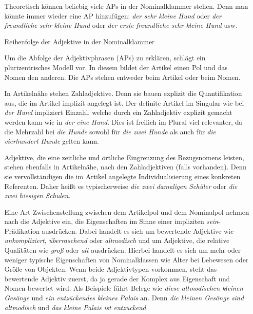 Theoretisch können beliebig viele APs in der Nominalklammer stehen. Denn man könnte immer wieder eine AP hinzufügen: \textit{der sehr kleine Hund} oder \textit{der freundliche sehr kleine Hund} oder \textit{der erste freundliche sehr kleine Hund} usw.  

\newpage
\begin{Exkurs}{Reihenfolge der Adjektive in der Nominalklammer}
    
\largerpage
Um die Abfolge der Adjektivphrasen (APs) zu erklären, schlägt \citet[317]{Eichinger1991} ein plurizentrisches Modell vor. In diesem bildet der Artikel einen Pol und das Nomen den anderen. Die APs stehen entweder beim Artikel oder beim Nomen. 

In Artikelnähe stehen Zahladjektive. Denn sie bauen explizit die Quantifikation aus, die im Artikel implizit angelegt ist. Der definite Artikel im Singular wie bei \textit{der Hund} impliziert Einzahl, welche durch ein Zahladjektiv explizit gemacht werden kann wie in \textit{der eine Hund}. Dies ist freilich im Plural viel relevanter, da die Mehrzahl bei \textit{die Hunde} sowohl für \textit{die zwei Hunde} als auch für \textit{die vierhundert Hunde} gelten kann.  

Adjektive, die eine zeitliche und örtliche Eingrenzung des Bezugsnomens leisten, stehen ebenfalls in Artikelnähe, nach den Zahladjektiven (falls vorhanden). Denn sie vervollständigen die im Artikel angelegte Individualisierung eines konkreten Referenten. Daher heißt es typischerweise \textit{die zwei damaligen Schüler} oder \textit{die zwei hiesigen Schulen}. 

Eine Art Zwischenstellung zwischen dem Artikelpol und dem Nominalpol nehmen nach \citet[321]{Eichinger1991} die Adjektive ein, die Eigenschaften im Sinne einer impliziten \textit{sein}-Prädikation ausdrücken. Dabei handelt es sich um bewertende Adjektive wie \textit{unkompliziert}, \textit{überraschend} oder \textit{altmodisch} und um Adjektive, die relative Qualitäten wie \textit{groß} oder \textit{alt} ausdrücken. Hierbei handelt es sich um mehr oder weniger typische Eigenschaften von Nominalklassen wie Alter bei Lebewesen oder Größe von Objekten. Wenn beide Adjektivtypen vorkommen, steht das bewertende Adjektiv zuerst, da ja gerade der Komplex aus Eigenschaft und Nomen bewertet wird. Als Beispiele führt \citet[321]{Eichinger1991} Belege wie \textit{diese altmodischen kleinen Gesänge} und \textit{ein entzückendes kleines Palais} an. Denn \textit{die kleinen Gesänge sind altmodisch} und \textit{das kleine Palais ist entzückend}.


\end{Exkurs}
